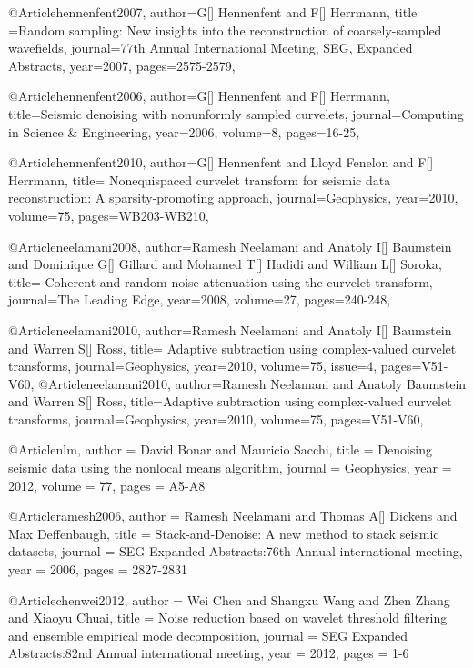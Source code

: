 @Article{hennenfent2007,
  author={G[] Hennenfent and F[] Herrmann},
  title ={Random sampling: New insights into the reconstruction of coarsely-sampled wavefields},
  journal={77th Annual International Meeting, SEG, Expanded Abstracts},
  year=2007,
  pages={2575-2579},
}

@Article{hennenfent2006,
  author={G[] Hennenfent and F[] Herrmann},
  title={Seismic denoising with nonunformly sampled curvelets},
  journal={Computing in Science \& Engineering},
  year=2006,
  volume=8,
  pages={16-25},
}

@Article{hennenfent2010,
  author={G[] Hennenfent and Lloyd Fenelon and F[] Herrmann},
  title={	
Nonequispaced curvelet transform for seismic data reconstruction: A sparsity-promoting approach},
  journal={Geophysics},
  year=2010,
  volume=75,
  pages={WB203-WB210},
}

@Article{neelamani2008,
  author={Ramesh Neelamani and Anatoly I[] Baumstein and Dominique G[] Gillard and Mohamed T[] Hadidi and William L[] Soroka},
  title={	
Coherent and random noise attenuation using the curvelet transform},
  journal={The Leading Edge},
  year=2008,
  volume=27,
  pages={240-248},
}


@Article{neelamani2010,
  author={Ramesh Neelamani and Anatoly I[] Baumstein and Warren S[] Ross},
  title={		
Adaptive subtraction using complex-valued curvelet transforms},
  journal={Geophysics},
  year=2010,
  volume=75,
  issue=4,
  pages={V51-V60},
}
@Article{neelamani2010,
  author={Ramesh Neelamani and Anatoly Baumstein and Warren S[] Ross},
  title={Adaptive subtraction using complex-valued curvelet transforms},
  journal={Geophysics},
  year=2010,
  volume=75,
  pages={V51-V60},
}


@Article{nlm,
  author = 	 {David Bonar and Mauricio Sacchi},
  title = 	 {Denoising seismic data using the nonlocal means algorithm},
  journal = 	 {Geophysics},
  year = 	 2012,
  volume =	 77,
  pages =	 {A5-A8}
}

@Article{ramesh2006,
  author = 	 {Ramesh Neelamani and Thomas A[] Dickens and Max Deffenbaugh},
  title = 	 {	
Stack‐and‐Denoise: A new method to stack seismic datasets},
  journal = 	 {SEG Expanded Abstracts:76th Annual international meeting},
  year = 	 2006,
  pages =	 {2827-2831}
}

@Article{chenwei2012,
  author = 	 {Wei Chen and Shangxu Wang and Zhen Zhang and Xiaoyu Chuai},
  title = 	 {Noise reduction based on wavelet threshold filtering and ensemble empirical mode decomposition},
  journal = 	 {SEG Expanded Abstracts:82nd Annual international meeting},
  year = 	 2012,
  pages =	 {1-6}
}

